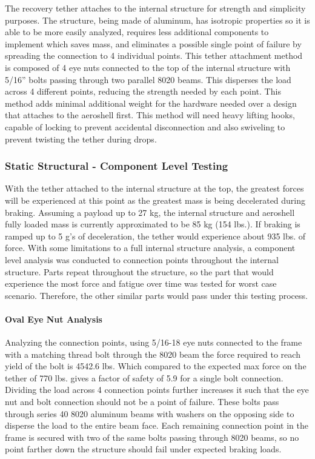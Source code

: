 \indent\indent The recovery tether attaches to the internal structure for strength and simplicity purposes. The structure, being made of aluminum, has isotropic properties so it is able to be more easily analyzed, requires less additional components to implement which saves mass, and eliminates a possible single point of failure by spreading the connection to 4 individual points. This tether attachment method is composed of 4 eye nuts connected to the top of the internal structure with 5/16” bolts passing through two parallel 8020 beams. This disperses the load across 4 different points, reducing the strength needed by each point. This method adds minimal additional weight for the hardware needed over a design that attaches to the aeroshell first. This method will need heavy lifting hooks, capable of locking to prevent accidental disconnection and also swiveling to prevent twisting the tether during drops.

\subsubsection*{Static Structural - Component Level Testing}
\indent\indent With the tether attached to the internal structure at the top, the greatest forces will be experienced at this point as the greatest mass is being decelerated during braking. Assuming a payload up to 27 kg, the internal structure and aeroshell fully loaded mass is currently approximated to be 85 kg (154 lbs.). If braking is ramped up to 5 g’s of deceleration, the tether would experience about 935 lbs. of force. With some limitations to a full internal structure analysis, a component level analysis was conducted to connection points throughout the internal structure. Parts repeat throughout the structure, so the part that would experience the most force and fatigue over time was tested for worst case scenario. Therefore, the other similar parts would pass under this testing process.

\paragraph{Oval Eye Nut Analysis} Analyzing the connection points, using 5/16-18 eye nuts connected to the frame with a matching thread bolt through the 8020 beam the force required to reach yield of the bolt is 4542.6 lbs. Which compared to the expected max force on the tether of 770 lbs. gives a factor of safety of 5.9 for a single bolt connection. Dividing the load across 4 connection points further increases it such that the eye nut and bolt connection should not be a point of failure. These bolts pass through series 40 8020 aluminum beams with washers on the opposing side to disperse the load to the entire beam face. Each remaining connection point in the frame is secured with two of the same bolts passing through 8020 beams, so no point farther down the structure should fail under expected braking loads.


